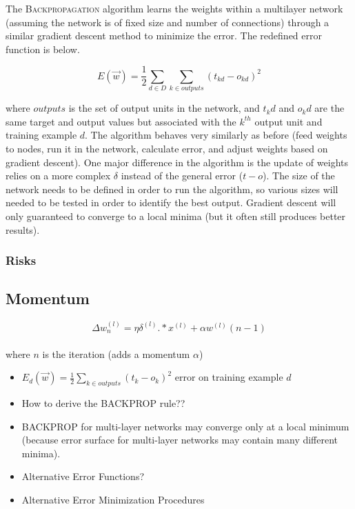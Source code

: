 \documentclass[11pt]{article}
\begin{document}
The \textsc{Backpropagation} algorithm learns the weights within a multilayer network (assuming the network is of fixed size and number of connections) through a similar gradient descent method to minimize the error. The redefined error function is below.

\begin{equation}
E(\vec{w}) = \frac12 \sum_{d\in D} \sum_{k \in outputs}{(t_{kd} - o_{kd})^2}
\end{equation}

where $outputs$ is the set of output units in the network, and $t_kd$ and $o_kd$ are the same target and output values but associated with the $k^{th}$ output unit and training example $d$. The algorithm behaves very similarly as before (feed weights to nodes, run it in the network, calculate error, and adjust weights based on gradient descent). One major difference in the algorithm is the update of weights relies on a more complex $\delta$ instead of the general error ($t-o$). The size of the network needs to be defined in order to run the algorithm, so various sizes will needed to be tested in order to identify the best output. Gradient descent will only guaranteed to converge to a local minima (but it often still produces better results).

\subsubsection{Risks}

\subsection{Momentum}
$$\Delta w^{(l)}_n= \eta \delta^{(l)}.*x^{(l)} +\alpha w^{(l)} (n-1) $$\\ where $n$ is the iteration (adds a momentum $\alpha$)
\begin{itemize}
\item $E_d(\vec{w}) = \frac12 \sum_{k\in outputs}{(t_k - o_k)^2}$ error on training example $d$
\item How to derive the \textsc{BACKPROP} rule??
\item \textsc{BACKPROP} for multi-layer networks may converge only at a local minimum (because error surface for multi-layer networks may contain many different minima).
\item Alternative Error Functions?
\item Alternative Error Minimization Procedures
\end{itemize}
\end{document}
